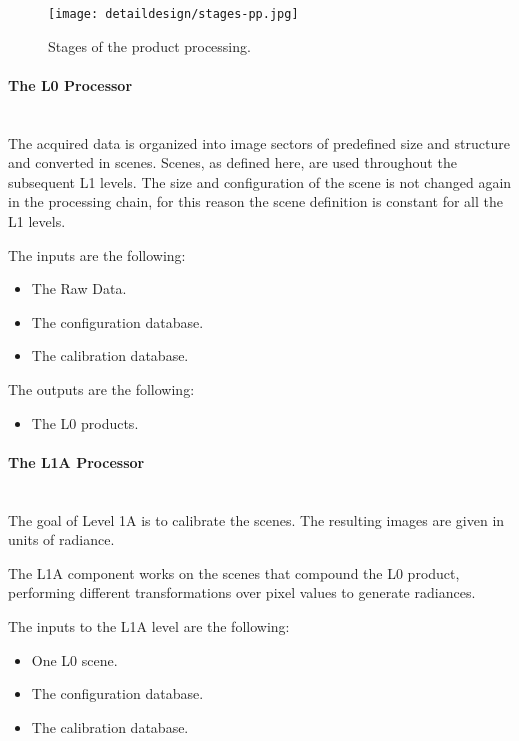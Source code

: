 \begin{figure}[!h]
\begin{center}
\texttt{[image: detaildesign/stages-pp.jpg]}
\caption{Stages of the product processing.}
\label{fig:cloud-states-pp}
\end{center}
\end{figure}

\paragraph{The L0 Processor}~\\

The acquired data is organized into image sectors of predefined size and structure and converted in scenes. Scenes, as defined here, are used throughout the subsequent L1 levels. The size and configuration of the scene is not changed again in the processing chain, for this reason the scene definition is constant for all the L1 levels.

The inputs are the following:
\begin{itemize}
\item The Raw Data.
\item The configuration database.
\item The calibration database.
\end{itemize}
The outputs are the following:
\begin{itemize}
\item The L0 products.
\end{itemize}

\paragraph{The L1A Processor}~\\
The goal of Level 1A is to calibrate the scenes. The resulting images are given in units of radiance.

The L1A component works on the scenes that compound the L0 product, performing different transformations over pixel values to generate radiances.

The inputs to the L1A level are the following:
\begin{itemize}
\item One L0 scene.
\item The configuration database.
\item The calibration database.
\end{itemize}

